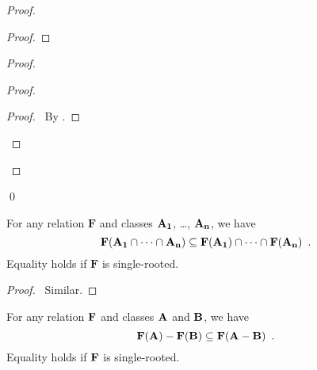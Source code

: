\begin{proof}
    \pf
    \begin{proof}
    \end{proof}
    \begin{proof}
        \begin{proof}
            \begin{proof}
                \pf\ By .
            \end{proof}
        \end{proof}
    \end{proof}
    \qed
\end{proof}

\begin{theorem}
    For any relation $\mathbf{F}$ and classes $\mathbf{A_1}$, \ldots, $\mathbf{A_n}$, we have
    \[ \mathbf{F}(\mathbf{A_1} \cap \cdots \cap \mathbf{A_n}) \subseteq \mathbf{F}(\mathbf{A_1}) \cap \cdots \cap \mathbf{F}(\mathbf{A_n}) \enspace . \]
    Equality holds if $\mathbf{F}$ is single-rooted.
\end{theorem}

\begin{proof}
    \pf\ Similar.
\end{proof}

\begin{theorem}
    For any relation $\mathbf{F}$ and classes $\mathbf{A}$ and $\mathbf{B}$, we have
    \[ \mathbf{F}(\mathbf{A}) - \mathbf{F}(\mathbf{B}) \subseteq \mathbf{F}(\mathbf{A} - \mathbf{B}) \enspace . \]
    Equality holds if $\mathbf{F}$ is single-rooted.
\end{theorem}

